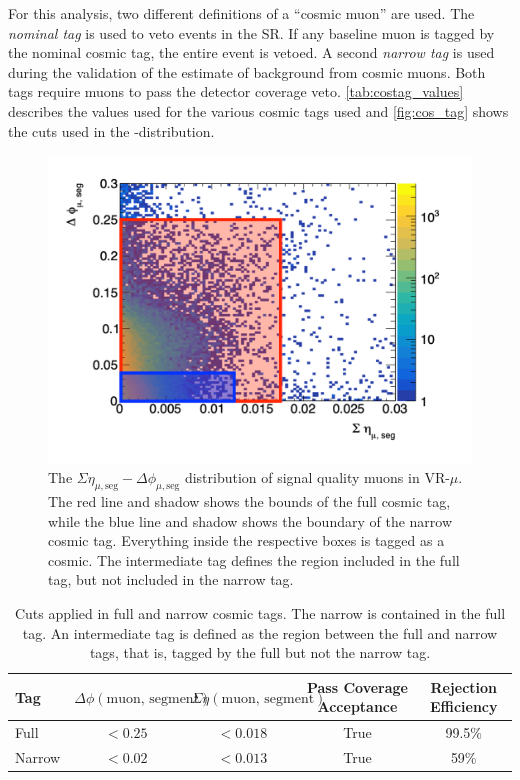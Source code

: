 For this analysis, two different definitions of a ``cosmic muon'' are used. The \emph{nominal tag} is used to veto events in the \ac{SR}. If any baseline muon is tagged by the nominal cosmic tag, the entire event is vetoed. A second \emph{narrow tag} is used during the validation of the estimate of background from cosmic muons. Both tags require muons to pass the detector coverage veto. \autoref{tab:costag_values} describes the values used for the various cosmic tags used and \autoref{fig:cos_tag} shows the cuts used in the \dphicos-\sigeta distribution. 

\begin{figure}[!ht]
\centering
\includegraphics[width=.48\textwidth]{figures/cosmics/cosmic_tag.png}
\caption{The $\Sigma\eta_{\mu,\textrm{seg}} - \Delta\phi_{\mu,\textrm{seg}}$ distribution of signal quality muons in VR-$\mu$. The red line and shadow shows the bounds of the full cosmic tag, while the blue line and shadow shows the boundary of the narrow cosmic tag. Everything inside the respective boxes is tagged as a cosmic. The intermediate tag defines the region included in the full tag, but not included in the narrow tag.}
\label{fig:cos_tag}
\end{figure}

\begin{table}
\centering
\begin{tabular}{lcccc}
Tag & $\Delta \phi (\textrm{muon, segment})$ & $\Sigma \eta (\textrm{muon, segment})$ & Pass Coverage Acceptance & Rejection Efficiency\\
\hline
Full   & $<0.25$   & $ <0.018 $   & True & 99.5\% \\
Narrow & $<0.02$   & $ <0.013$    & True & 59\% \\
\hline
\end{tabular}
\caption{Cuts applied in full and narrow cosmic tags. The narrow is contained in the full tag. An intermediate tag is defined as the region between the full and narrow tags, that is, tagged by the full but not the narrow tag.}
\label{tab:costag_values}
\end{table}

